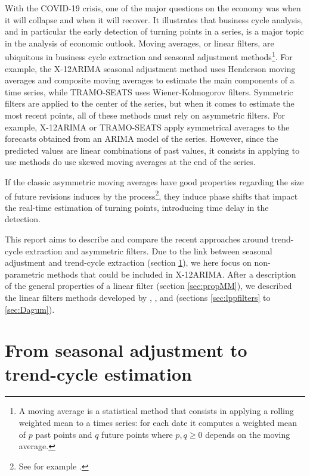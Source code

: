 \documentclass[
  12pt,
  ,
  a4paper]{article}
\newcommand\1{\mathds{1}}
\begin{document}
With the COVID-19 crisis, one of the major questions on the economy was when it will collapse and when it will recover.
It illustrates that business cycle analysis, and in particular the early detection of turning points in a series, is a major topic in the analysis of economic outlook.
Moving averages, or linear filters, are ubiquitous in business cycle extraction and seasonal adjustment methods\footnote{A moving average is a statistical method that consists in applying a rolling weighted mean to a times series: for each date it computes a weighted mean of \(p\) past points and \(q\) future points where \(p,q\geq0\) depends on the moving average.}.
For example, the X-12ARIMA seasonal adjustment method uses Henderson moving averages and composite moving averages to estimate the main components of a time series, while TRAMO-SEATS uses Wiener-Kolmogorov filters.
Symmetric filters are applied to the center of the series, but when it comes to estimate the most recent points, all of these methods must rely on asymmetric filters.
For example, X-12ARIMA or TRAMO-SEATS apply symmetrical averages to the forecasts obtained from an ARIMA model of the series.
However, since the predicted values are linear combinations of past values, it consists in applying to use methods do use skewed moving averages at the end of the series.

If the classic asymmetric moving averages have good properties regarding the size of future revisions induces by the process\footnote{See for example \textcite{pierce1980SA}.}, they induce phase shifts that impact the real-time estimation of turning points, introducing time delay in the detection.

This report aims to describe and compare the recent approaches around trend-cycle extraction and asymmetric filters.
Due to the link between seasonal adjustment and trend-cycle extraction (section \ref{sec:SAtoTCE}), we here focus on non-parametric methods that could be included in X-12ARIMA.
After a description of the general properties of a linear filter (section \ref{sec:propMM}), we described the linear filters methods developed by \textcite{proietti2008}, \textcite{ch15HBSA}, \textcite{trilemmaWMR2019} and \textcite{dagumbianconcini2008} (sections \ref{sec:lppfilters} to \ref{sec:Dagum}).

\newpage

\hypertarget{sec:SAtoTCE}{%
\section{From seasonal adjustment to trend-cycle estimation}\label{sec:SAtoTCE}}
\end{document}
